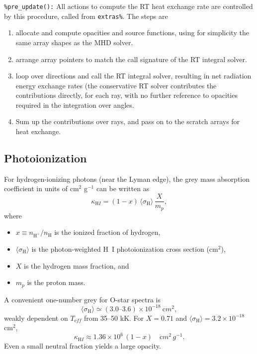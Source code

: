 \documentclass[paper=a4,fontsize=11pt]{scrartcl}
\numberwithin{equation}{section}		%
\numberwithin{figure}{section}			%
\numberwithin{table}{section}				%
\begin{document}
\verb|%pre_update():| All actions to compute the RT heat exchange rate are controlled by this procedure, called from \verb|extras%|.  The steps are
\begin{enumerate}
    \item allocate and compute opacities and source functions, using for simplicity the same array shapes as the MHD solver.
    \item arrange array pointers to match the call signature of the RT integral solver.
    \item loop over directions and call the RT integral solver, resulting in net radiation energy exchange rates (the conservative RT solver contributes the contributions directly, for each ray, with no further reference to opacities required in the integration over angles.
    \item Sum up the contributions over rays, and pass on to the scratch arrays for heat exchange.
\end{enumerate}

\subsection{Photoionization}

For hydrogen-ionizing photons (near the Lyman edge), the grey mass absorption coefficient in units of cm$^2$ g$^{-1}$ can be written as
\begin{equation}
\kappa_{\mathrm HI} = (1-x)\,\langle\sigma_{\mathrm H}\rangle\,\frac{X}{m_p},
\label{eq:kappa_general}
\end{equation}
where
\begin{itemize}
    \item $x \equiv n_{\mathrm H^+}/n_{\mathrm H}$ is the ionized fraction of hydrogen,
    \item $\langle\sigma_{\mathrm H}\rangle$ is the photon-weighted H~I photoionization cross section (cm$^2$),
    \item $X$ is the hydrogen mass fraction, and
    \item $m_p$ is the proton mass.
\end{itemize}

A convenient one-number grey for O-star spectra is
\begin{equation}
\langle\sigma_{\mathrm H}\rangle \simeq (3.0\text{--}3.6)\times 10^{-18} \ {\mathrm cm^2},
\end{equation}
weakly dependent on $T_{\mathrm eff}$ from 35--50 kK.  
For $X=0.71$ and $\langle\sigma_{\mathrm H}\rangle = 3.2\times10^{-18}$ cm$^2$,
\begin{equation}
\kappa_{\mathrm HI} \approx 1.36\times 10^{6}\,(1-x) \quad {\mathrm cm^2\,g^{-1}}.
\end{equation}
Even a small neutral fraction yields a large opacity.
\end{document}
